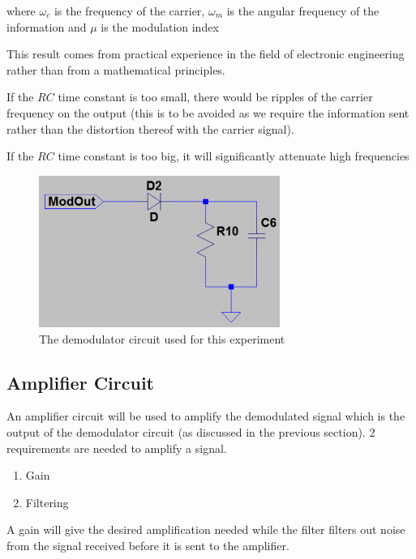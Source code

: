 \documentclass[12pt, a4paper]{article}
\begin{document}
		where $\omega_c$ is the frequency of the carrier, $\omega_m$ is the angular frequency of the information and $\mu$ is the modulation index

		This result comes from practical experience in the field of electronic engineering rather than from a mathematical principles.

		If the $RC$ time constant is too small, there would be ripples of the carrier frequency on the output (this is to be avoided as we require the information sent rather than the distortion thereof with the carrier signal).

		If the $RC$ time constant is too big, it will significantly attenuate high frequencies 


		\begin{figure}[H]
			\centering
			\includegraphics[width=0.7\textwidth]{images/Demodulator_circuit.png}
			\caption{The demodulator circuit used for this experiment}
			\label{fig:demodulator_circuit}
		\end{figure}

	\subsection{Amplifier Circuit} %
	\label{sub:amplifier_circuit}
	 An amplifier circuit will be used to amplify the demodulated signal which is the output of the demodulator circuit (as discussed in the previous section). 2 requirements are needed to amplify a signal.
	 \begin{enumerate}
	 	\item Gain
	 	\item Filtering
	 \end{enumerate}

	 A gain will give the desired amplification needed while the filter filters out noise from the signal received before it is sent to the amplifier.
	
\end{document}
